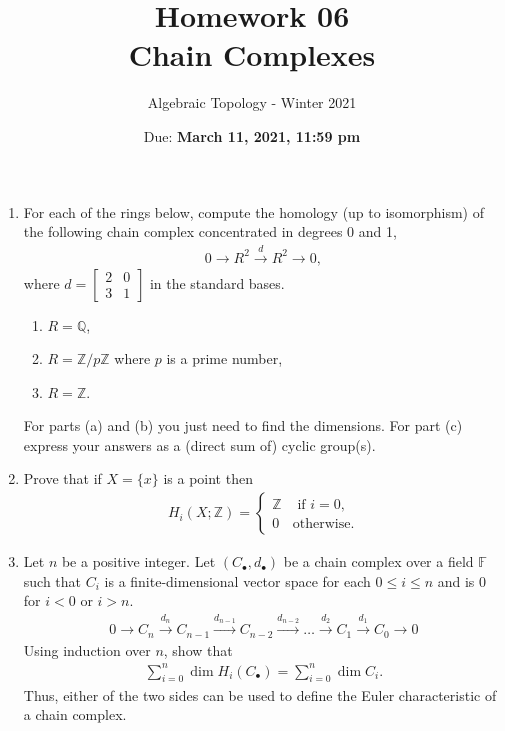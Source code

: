 \documentclass{article}
\title{Homework 06 \\ Chain Complexes}
\author{Algebraic Topology - Winter 2021}
\date{Due: \textbf{March 11, 2021, 11:59 pm}}
\begin{document}
\maketitle

\begin{enumerate}
    \item For each of the rings below, compute the homology (up to isomorphism) of the following chain complex concentrated in degrees 0 and 1,
    \begin{align*}
        0 \to R^2 \overset{d}{\longrightarrow} R^2 \to 0,
    \end{align*}
    where $d = \begin{bmatrix} 2 & 0 \\ 3 & 1\end{bmatrix}$ in the standard bases.
    \begin{enumerate}
        \item $ R = \mathbb{Q}$,
        \item $ R = \mathbb{Z}/p \mathbb{Z}$ where $p$ is a prime number,
        \item $ R = \mathbb{Z}$.
    \end{enumerate}
    For parts (a) and (b) you just need to find the dimensions. For part (c) express your answers as a (direct sum of) cyclic group(s).
    \item Prove that if $X = \{x\}$ is a point then 
    \begin{align*}
        H_i(X; \mathbb{Z}) = 
        \begin{cases}
        \mathbb{Z} & \mbox{ if } i = 0, \\
        0 & \mbox{otherwise.}
        \end{cases}
    \end{align*}
    
        \item Let $n$ be a positive integer. Let $(C_\bullet, d_\bullet)$ be a chain complex over a field $\mathbb{F}$ such that $C_i$ is a finite-dimensional vector space for each $ 0 \le i \le n$ and is 0 for $ i < 0$ or $i > n$. 
    \begin{align*}
        0 \to C_n \overset{d_n}{\longrightarrow} C_{n-1}
        \overset{d_{n-1}}{\longrightarrow} C_{n-2}
        \overset{d_{n-2}}{\longrightarrow} 
        \dots
        \overset{d_{2}}{\longrightarrow} C_1
        \overset{d_{1}}{\longrightarrow} C_0
        \to 0
    \end{align*}
    Using induction over $n$, show that 
    \begin{align*}
        \sum \limits_{i=0}^n \dim H_i (C_\bullet) =        
        \sum \limits_{i=0}^n \dim C_i.
    \end{align*}
    Thus, either of the two sides can be used to define the Euler characteristic of a chain complex.
    
\end{enumerate}
\end{document}
